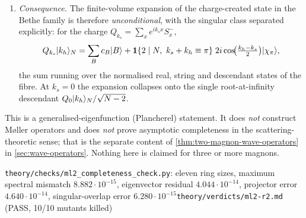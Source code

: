 \begin{theorem}
\begin{enumerate}
\begin{equation}
      \abs{\braket{\Psi^{\mathrm{sc}}_{Kq},\psi}}^2
    +\int_{-\pi}^{\pi}\!dK\;
      \abs{\braket{\Psi^{\mathrm{b}}_{K},\psi}}^2 .
    \label{eq:plancherel}
  \end{equation}
  The Plancherel measures are $dK\,dq/(2\pi)^2$ and $dK/(2\pi)$ for the
  unnormalised kernels. The spectrum on this sector is purely absolutely
  continuous; the bound state of \cref{eq:bound-band} becomes a band, present
  for every $K\ne0$ and degenerating at $K=0$ into a threshold resonance.
\item \emph{Consequence.} The finite-volume expansion of the charge-created
  state in the Bethe family is therefore \emph{unconditional}, with the
  singular class separated explicitly: for the charge $Q_{k_s}=\sum_xe^{ik_sx}S^-_x$,
  \begin{equation}
    Q_{k_s}|k_h\rangle_N
    =\sum_{B}c_B|B\rangle
     +\mathbf 1\{2\mid N,\ k_s+k_h\equiv\pi\}\;
      2i\cos\!\bigl(\tfrac{k_h-k_s}{2}\bigr)|\chi_\pi\rangle,
    \label{eq:charge-expansion}
  \end{equation}
  the sum running over the normalised real, string and descendant states of
  the fibre. At $k_s=0$ the expansion collapses onto the single
  root-at-infinity descendant $Q_0|k_h\rangle_N/\sqrt{N-2}$.
\end{enumerate}
\end{theorem}
\begin{scope}
This is a generalised-eigenfunction (Plancherel) statement. It does \emph{not}
construct M\o{}ller operators and does \emph{not} prove asymptotic
completeness in the scattering-theoretic sense; that is the separate content
of \cref{thm:two-magnon-wave-operators} in
\cref{sec:wave-operators}. Nothing here is claimed for three or more magnons.
\end{scope}
%
{\texttt{theory/checks/ml2\_completeness\_check.py}: eleven ring sizes,
maximum spectral mismatch $8.882\cdot10^{-15}$, eigenvector residual
$4.044\cdot10^{-14}$, projector error $4.640\cdot10^{-14}$, singular-overlap
error $6.280\cdot10^{-15}$}{\texttt{theory/verdicts/ml2-r2.md} (PASS, 10/10
mutants killed)}

